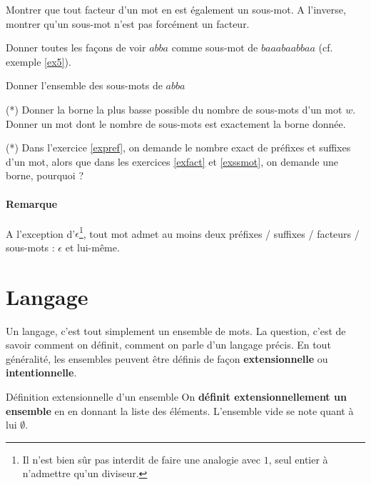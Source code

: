\begin{exercice}
Montrer que tout facteur d'un mot en est également un sous-mot. A l'inverse, montrer qu'un sous-mot n'est pas forcément un facteur. 
\end{exercice}

\begin{exercice}
Donner toutes les façons de voir $abba$ comme sous-mot de $baaabaabbaa$ (cf. exemple \ref{ex5}).
\end{exercice}

\begin{exercice}
Donner l'ensemble des sous-mots de $abba$
\end{exercice}

\begin{exercice}\label{exssmot} (*)
Donner la borne la plus basse possible du nombre de sous-mots d'un mot $w$. Donner un mot dont le nombre de sous-mots est exactement la borne donnée.
\end{exercice}

\begin{exercice} (*) Dans l'exercice \ref{expref}, on demande le nombre exact de préfixes et suffixes d'un mot, alors que dans les exercices \ref{exfact} et \ref{exssmot}, on demande une borne, pourquoi ?

\end{exercice}

\paragraph{Remarque} A l'exception d'$\epsilon$\footnote{Il n'est bien sûr pas interdit de faire une analogie avec $1$, seul entier à n'admettre qu'un diviseur.}, tout mot admet au moins deux préfixes / suffixes / facteurs / sous-mots : $\epsilon$ et lui-même. 


\section{Langage}


 Un langage, c'est tout simplement un ensemble de mots. La question, c'est de savoir comment on définit, comment on parle d'un langage précis. En tout généralité, les ensembles peuvent être définis de façon \textbf{extensionnelle} ou \textbf{intentionnelle}. 

\begin{definition}{Définition extensionnelle d'un ensemble}{}
On \textbf{définit extensionnellement un ensemble} en en donnant la liste des éléments. L'ensemble vide se note quant à lui $\emptyset$.
\end{definition}

